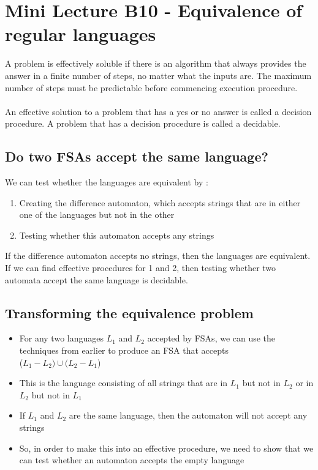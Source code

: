 \documentclass[11pt,twoside,a4paper]{article}
\begin{document}
\section{Mini Lecture B10 - Equivalence of regular languages}
A problem is effectively soluble if there is an algorithm that always provides the answer in a finite number of steps, no matter what the inputs are. The maximum number of steps must be predictable before commencing execution procedure.
\\
\\
An effective solution to a problem that has a yes or no answer is called a decision procedure. A problem that has a decision procedure is called a decidable.
\subsection{Do two FSAs accept the same language?}
We can test whether the languages are equivalent by : \\
\begin{enumerate}
	\item Creating the difference automaton, which accepts strings that are in either one of the languages but not in the other
	\item Testing whether this automaton accepts any strings
\end{enumerate}
If the difference automaton accepts no strings, then the languages are equivalent.\\
If we can find effective procedures for 1 and 2, then testing whether two automata accept the same language is decidable.
\subsection{Transforming the equivalence problem}
\begin{itemize}
	\item For any two languages $L_1$ and $L_2$ accepted by FSAs, we can use the techniques from earlier to produce an FSA that accepts \\($L_1 - L_2) \cup (L_2 - L_1$)
	\item This is the language consisting of all strings that are in $L_1$ but not in $L_2$ or in $L_2$ but not in $L_1$
	\item If $L_1$ and $L_2$ are the same language, then the automaton will not accept any strings
	\item So, in order to make this into an effective procedure, we need to show that we can test whether an automaton accepts the empty language
\end{itemize}
\end{document}
